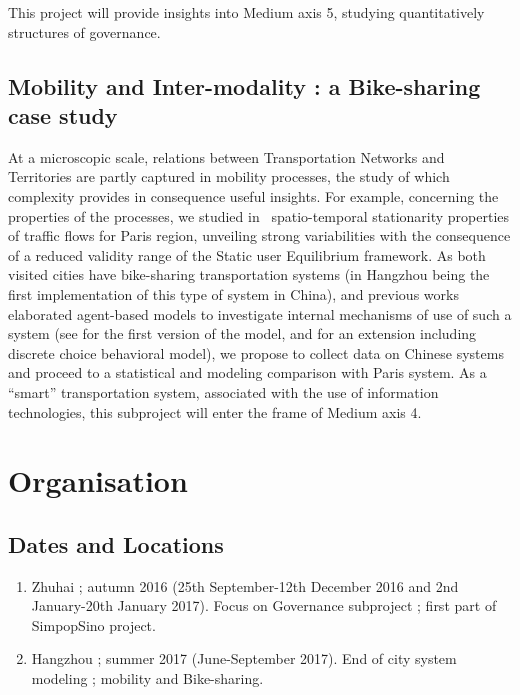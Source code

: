 This project will provide insights into Medium axis 5, studying quantitatively structures of governance.


\subsection{Mobility and Inter-modality : a Bike-sharing case study}


At a microscopic scale, relations between Transportation Networks and Territories are partly captured in mobility processes, the study of which complexity provides in consequence useful insights. For example, concerning the properties of the processes, we studied in~\cite{2016arXiv160805266R} spatio-temporal stationarity properties of traffic flows for Paris region, unveiling strong variabilities with the consequence of a reduced validity range of the Static user Equilibrium framework. As both visited cities have bike-sharing transportation systems (in Hangzhou being the first implementation of this type of system in China), and previous works elaborated agent-based models to investigate internal mechanisms of use of such a system (see \cite{raimbault2015user} for the first version of the model, and \cite{raimbault2015hybrid} for an extension including discrete choice behavioral model), we propose to collect data on Chinese systems and proceed to a statistical and modeling comparison with Paris system. As a ``smart'' transportation system, associated with the use of information technologies, this subproject will enter the frame of Medium axis 4.



\section{Organisation}


\subsection{Dates and Locations}

\begin{enumerate}
\item Zhuhai ; autumn 2016 (25th September-12th December 2016 and 2nd January-20th January 2017). Focus on Governance subproject ; first part of SimpopSino project.
\item Hangzhou ; summer 2017 (June-September 2017). End of city system modeling ; mobility and Bike-sharing.
\end{enumerate}



